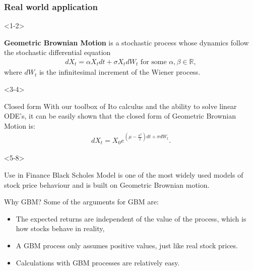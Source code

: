 \documentclass[10pt]{beamer}
\begin{document}
\begin{frame}[t]
  \frametitle{Real world application}
  \begin{onlyenv}<1-2>
    \begin{definition}
      \textbf{Geometric Brownian Motion} is a stochastic process whose dynamics follow the stochastic differential equation 
      \begin{align*}
        dX_t = \alpha X_t dt + \sigma X_t dW_t \text{ for some } \alpha,\beta \in \mathbb{R},
      \end{align*}
      where $dW_t$ is the infinitesimal increment of the Wiener process.
    \end{definition}
  \end{onlyenv}
  \begin{onlyenv}<3-4>
    \begin{block}{Closed form}
      With our toolbox of Ito calculus and the ability to solve linear ODE's, it can be easily shown that the closed form of Geometric Brownian Motion is:
      \begin{align*}
        dX_t = X_0 e^{(\mu - \frac{\sigma^2}{2})dt + \sigma dW_t}.
      \end{align*}
    \end{block}
  \end{onlyenv}
  \begin{onlyenv}<5-8>
    \begin{block}{Use in Finance}
      Black Scholes Model is one of the most widely used models of stock price behaviour and is built on Geometric Brownian motion.
    \end{block}
    \begin{block}{Why GBM?}
      Some of the arguments for GBM are:
      \begin{itemize}
        \item<6-> The expected returns are independent of the value of the process, which is how stocks behave in reality,
        \item<7-> A GBM process only assumes positive values, just like real stock prices.
        \item<8-> Calculations with GBM processes are relatively easy.

\end{itemize}
\end{block}
\end{onlyenv}
\end{frame}
\end{document}
